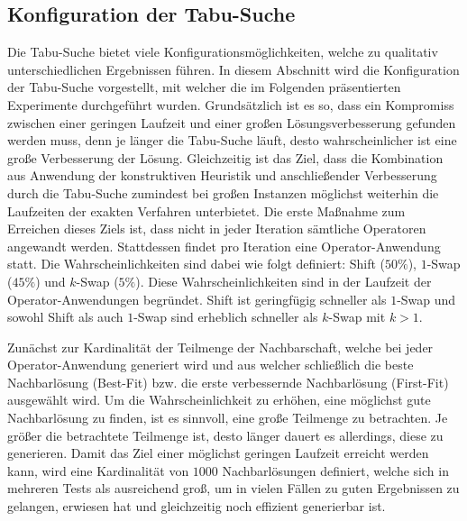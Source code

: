 \subsection{Konfiguration der Tabu-Suche}
\label{sec:tabu_search_config}

Die Tabu-Suche bietet viele Konfigurationsmöglichkeiten, welche zu qualitativ unterschiedlichen
Ergebnissen führen. In diesem Abschnitt wird die Konfiguration der Tabu-Suche vorgestellt,
mit welcher die im Folgenden präsentierten Experimente durchgeführt wurden.
Grundsätzlich ist es so, dass ein Kompromiss zwischen einer geringen Laufzeit und einer großen Lösungsverbesserung
gefunden werden muss, denn je länger die Tabu-Suche läuft, desto wahrscheinlicher ist eine große Verbesserung
der Lösung. Gleichzeitig ist das Ziel, dass die Kombination aus Anwendung der konstruktiven Heuristik und anschließender Verbesserung durch die Tabu-Suche zumindest bei großen Instanzen möglichst weiterhin die Laufzeiten der exakten Verfahren unterbietet. Die erste Maßnahme zum Erreichen dieses Ziels ist, dass nicht in jeder Iteration sämtliche Operatoren angewandt werden. Stattdessen findet pro Iteration eine Operator-Anwendung statt. Die Wahrscheinlichkeiten sind dabei wie folgt definiert: Shift ($50 \%$), $1$-Swap ($45 \%$) und $k$-Swap ($5 \%$). Diese Wahrscheinlichkeiten sind in der Laufzeit der Operator-Anwendungen begründet. Shift ist geringfügig schneller als $1$-Swap und sowohl Shift
als auch $1$-Swap sind erheblich schneller als $k$-Swap mit $k > 1$.

Zunächst zur Kardinalität der Teilmenge der Nachbarschaft, welche bei jeder Operator-Anwendung generiert wird
und aus welcher schließlich die beste Nachbarlösung (Best-Fit) bzw. die erste verbessernde Nachbarlösung (First-Fit)
ausgewählt wird. Um die Wahrscheinlichkeit zu erhöhen, eine möglichst gute Nachbarlösung zu finden, ist es sinnvoll, eine
große Teilmenge zu betrachten. Je größer die betrachtete Teilmenge ist, desto länger dauert es allerdings,
diese zu generieren. Damit das Ziel einer möglichst geringen Laufzeit erreicht werden kann, wird eine Kardinalität
von $1000$ Nachbarlösungen definiert, welche sich in mehreren Tests als ausreichend groß, um in vielen Fällen zu guten
Ergebnissen zu gelangen, erwiesen hat und gleichzeitig noch effizient generierbar ist.


